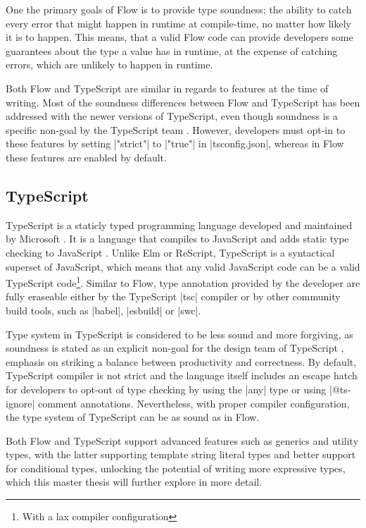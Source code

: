 One the primary goals of Flow is to provide type soundness; the ability to catch every error that might happen in runtime at compile-time, no matter how likely it is to happen. This means, that a valid Flow code can provide developers some guarantees about the type a value has in runtime, at the expense of catching errors, which are unlikely to happen in runtime.

Both Flow and TypeScript are similar in regards to features at the time of writing. Most of the soundness differences between Flow and TypeScript has been addressed with the newer versions of TypeScript, even though soundness is a specific non-goal by the TypeScript team \cite{TypeScriptDesignGoals}. However, developers must opt-in to these features by setting \code|"strict"| to \code|"true"| in \code|tsconfig.json|, whereas in Flow these features are enabled by default.

\subsection{TypeScript}

TypeScript is a staticly typed programming language developed and maintained by Microsoft \cite{TypeScriptJavaScriptSyntax}. It is a language that compiles to JavaScript and adds static type checking to JavaScript \cite{DocumentationTypeScriptJavaScript}. Unlike Elm or ReScript, TypeScript is a syntactical superset of JavaScript, which means that any valid JavaScript code can be a valid TypeScript code\footnote{With a lax compiler configuration}. Similar to Flow, type annotation provided by the developer are fully eraseable either by the TypeScript \code|tsc| compiler or by other community build tools, such as \code|babel|\cite{BabelCompilerNext}, \code|esbuild|\cite{EsbuildExtremelyFast} or \code|swc|\cite{SWCRustbasedPlatform}.

Type system in TypeScript is considered to be less sound and more forgiving, as soundness is stated as an explicit non-goal for the design team of TypeScript \cite{TypeScriptDesignGoals}, emphasis on striking a balance between productivity and correctness. By default, TypeScript compiler is not strict and the language itself includes an escape hatch for developers to opt-out of type checking by using the \code|any| type or using \code|@ts-ignore| comment annotations. Nevertheless, with proper compiler configuration, the type system of TypeScript can be as sound as in Flow.

Both Flow and TypeScript support advanced features such as generics and utility types, with the latter supporting template string literal types and better support for conditional types, unlocking the potential of writing more expressive types, which this master thesis will further explore in more detail.

